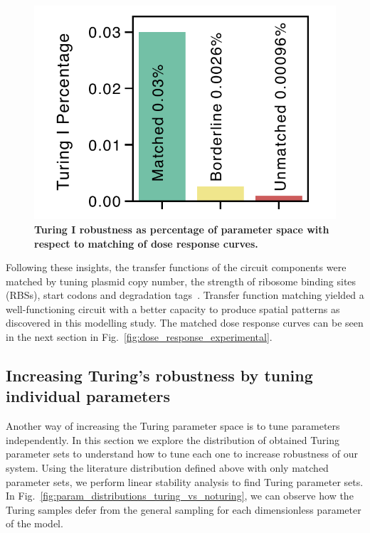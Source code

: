 \begin{figure}[H]
    \centering
    \includegraphics[width=1\textwidth]{chapters/Chapter 2/balancing_robustness}
    \caption{\textbf{Turing I robustness as percentage of parameter space with respect to matching of dose response curves.}}
    \label{fig:balancing_robustness}
\end{figure}

Following these insights, the transfer functions of the circuit components were matched by tuning plasmid copy number,
the strength of ribosome binding sites (RBSs),
start codons and degradation tags~\parencite{Andersen1998, Wang2011,Hecht2017}.
Transfer function matching yielded a well-functioning circuit with a better capacity to produce spatial patterns
as discovered in this modelling study.
The matched dose response curves can be seen in the next section in Fig.~\ref{fig:dose_response_experimental}.


\subsection{Increasing Turing's robustness by tuning individual parameters}
Another way of increasing the Turing parameter space is to tune parameters independently.
In this section we explore the distribution of obtained Turing parameter sets
to understand how to tune each one to increase robustness of our system.
Using the literature distribution defined above with only matched
parameter sets, we perform linear stability analysis to find Turing parameter sets.
In Fig.~\ref{fig:param_distributions_turing_vs_noturing},
we can observe how the Turing samples defer from the general sampling for each dimensionless parameter of the model.

